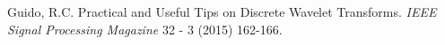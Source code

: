 \begin{thebibliography}{00}
	Guido, R.C. Practical and Useful Tips on Discrete Wavelet Transforms. \textit{IEEE Signal Processing Magazine} 32 - 3 (2015) 162-166. 
\end{thebibliography}